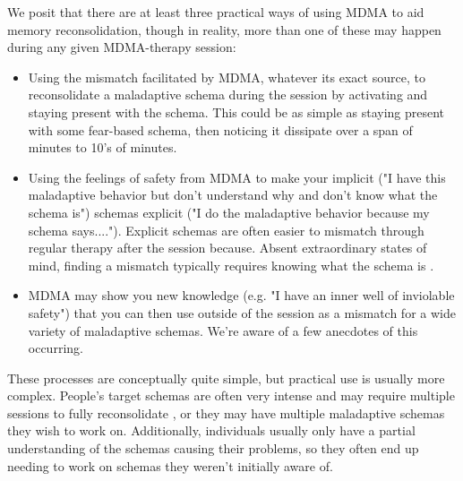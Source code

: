 \documentclass[12pt,letterpaper]{book}
\begin{document}
We posit that there are at least three practical ways of using MDMA to aid memory reconsolidation, though in reality, more than one of these may happen during any given MDMA-therapy session:
\begin{itemize}
	\item Using the mismatch facilitated by MDMA, whatever its exact source, to reconsolidate a maladaptive schema during the session by activating and staying present with the schema. This could be as simple as staying present with some fear-based schema, then noticing it dissipate over a span of minutes to 10's of minutes.
	\item Using the feelings of safety from MDMA to make your implicit ("I have this maladaptive behavior but don't understand why and don't know what the schema is") schemas explicit ("I do the maladaptive behavior because my schema says...."). Explicit schemas are often easier to mismatch through regular therapy after the session because. Absent extraordinary states of mind, finding a mismatch typically requires knowing what the schema is \cite{eckerUnlocking}.
	\item MDMA may show you new knowledge (e.g. "I have an inner well of inviolable safety") that you can then use outside of the session as a mismatch for a wide variety of maladaptive schemas. We're aware of a few anecdotes of this occurring.
\end{itemize}
These processes are conceptually quite simple, but practical use is usually more complex. People's target schemas are often very intense and may require multiple sessions to fully reconsolidate \cite{mitchellMDMAClinicalTrial}, or they may have multiple maladaptive schemas they wish to work on. Additionally, individuals usually only have a partial understanding of the schemas causing their problems, so they often end up needing to work on schemas they weren't initially aware of.
\end{document}
